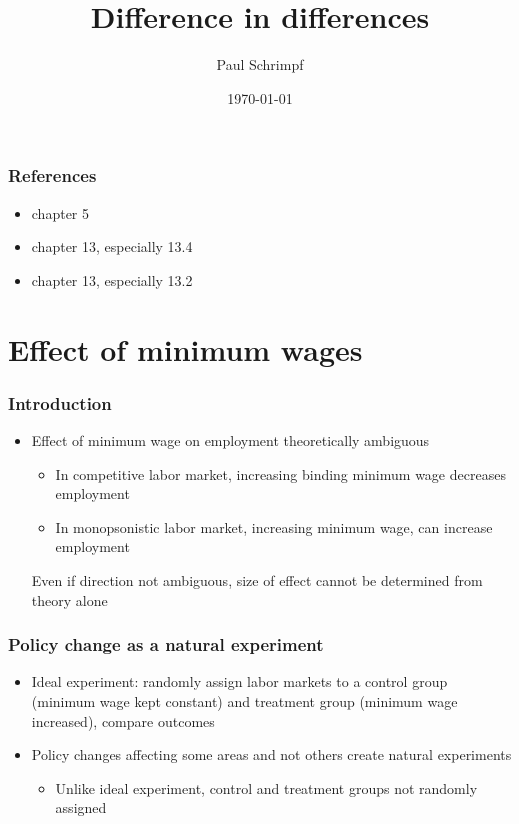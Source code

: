 %

\title{Difference in differences} 
\author{Paul Schrimpf} 
\date{\today}

\graphicspath{{figures/}}



\frame{\titlepage}

\begin{frame}
  \tableofcontents  
\end{frame}

\begin{frame}
  \frametitle{References}
  \begin{itemize}
  \item \cite{ap2014} chapter 5
  \item \cite{sw2009} chapter 13, especially 13.4
  \item \cite{w2013} chapter 13, especially 13.2
  \end{itemize} 
\end{frame}

\section{Effect of minimum wages}

\begin{frame}[allowframebreaks]\frametitle{Introduction}
  \begin{itemize}
  \item Effect of minimum wage on employment theoretically ambiguous
    \begin{itemize}
    \item In competitive labor market, increasing binding minimum wage
      decreases employment
    \item In monopsonistic labor market, increasing minimum wage, can
      increase employment
    \end{itemize}
    Even if direction not ambiguous, size of effect cannot be
    determined from theory alone    
  \end{itemize}
\end{frame}

\begin{frame}\frametitle{Policy change as a natural experiment}
  \begin{itemize}
  \item Ideal experiment: randomly assign labor markets to a control
    group (minimum wage kept constant) and treatment group (minimum
    wage increased), compare outcomes
  \item Policy changes affecting some areas and not others create
    natural experiments
    \begin{itemize}
    \item Unlike ideal experiment, control and treatment groups not
      randomly assigned
    \end{itemize}
  \end{itemize}
\end{frame}

